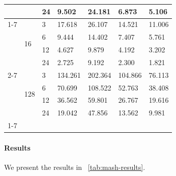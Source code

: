 \documentclass[12pt, a4paper]{report}
\begin{document}
\begin{tabular}{lllllll}
 &  & 24 & 9.502 & 24.181 & 6.873 & 5.106 \\
\cline{1-7} \cline{2-7}
\multirow[t]{8}{*}{245760} & \multirow[t]{4}{*}{16} & 3 & 17.618 & 26.107 & 14.521 & 11.006 \\
 &  & 6 & 9.444 & 14.402 & 7.407 & 5.761 \\
 &  & 12 & 4.627 & 9.879 & 4.192 & 3.202 \\
 &  & 24 & 2.725 & 9.192 & 2.300 & 1.821 \\
\cline{2-7}
 & \multirow[t]{4}{*}{128} & 3 & 134.261 & 202.364 & 104.866 & 76.113 \\
 &  & 6 & 70.699 & 108.522 & 52.763 & 38.408 \\
 &  & 12 & 36.562 & 59.801 & 26.767 & 19.616 \\
 &  & 24 & 19.042 & 47.856 & 13.562 & 9.981 \\
\cline{1-7} \cline{2-7}
\bottomrule
\end{tabular}


\paragraph{Results} We present the results in \tablename~\ref{tab:mash-results}.

\end{document}
